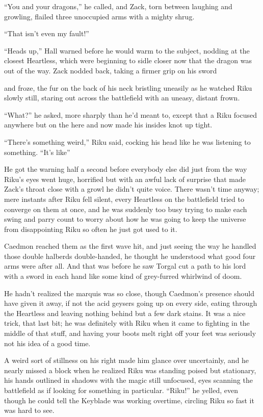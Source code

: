 ``You and your dragons,'' he called, and Zack, torn between laughing and growling, flailed three unoccupied arms with a mighty shrug.

``That isn't even my fault!''

``Heads up,'' Hall warned before he would warm to the subject, nodding at the closest Heartless, which were beginning to sidle closer now that the dragon was out of the way. Zack nodded back, taking a firmer grip on his sword\textemdash 

\textemdash and froze, the fur on the back of his neck bristling uneasily as he watched Riku slowly still, staring out across the battlefield with an uneasy, distant frown.

``What?'' he asked, more sharply than he'd meant to, except that a Riku focused anywhere but on the here and now made his insides knot up tight.

``There's something weird,'' Riku said, cocking his head like he was listening to something. ``It's like\textemdash ''

He got the warning half a second before everybody else did just from the way Riku's eyes went huge, horrified but with an awful lack of surprise that made Zack's throat close with a growl he didn't quite voice. There wasn't time anyway; mere instants after Riku fell silent, every Heartless on the battlefield tried to converge on them at once, and he was suddenly too busy trying to make each swing and parry count to worry about how he was going to keep the universe from disappointing Riku so often he just got used to it.

Caedmon reached them as the first wave hit, and just seeing the way he handled those double halberds double-handed, he thought he understood what good four arms were after all. And that was before he saw Torgal cut a path to his lord with a sword in each hand like some kind of grey-furred whirlwind of doom.

He hadn't realized the marquis was so close, though Caedmon's presence should have given it away, if not the acid geysers going up on every side, eating through the Heartless and leaving nothing behind but a few dark stains. It was a nice trick, that last bit; he was definitely with Riku when it came to fighting in the middle of that stuff, and having your boots melt right off your feet was seriously not his idea of a good time.

A weird sort of stillness on his right made him glance over uncertainly, and he nearly missed a block when he realized Riku was standing poised but stationary, his hands outlined in shadows with the magic still unfocused, eyes scanning the battlefield as if looking for something in particular. ``Riku!'' he yelled, even though he could tell the Keyblade was working overtime, circling Riku so fast it was hard to see.

